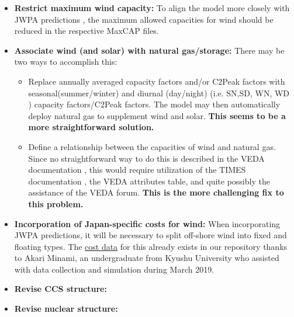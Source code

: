 \documentclass[14pt,a4paper]{article} %
\begin{document}
\begin{itemize}

\item \textbf{Restrict maximum wind capacity:} To align the model more closely with JWPA predictions \cite{heger_wind_2016}, the maximum allowed capacities for wind should be reduced in the respective MaxCAP files.

\item \textbf{Associate wind (and solar) with natural gas/storage:} There may be two ways to accomplish this:

\begin{itemize}

\item Replace annually averaged capacity factors and/or C2Peak factors with seasonal(summer/winter) and diurnal (day/night) (i.e. SN,SD, WN, WD \cite{gargiulo_documentation_2005} ) capacity factors/C2Peak factors. The model may then automatically deploy natural gas to supplement wind and solar. \textbf{This seems to be a more straightforward solution.}

\item Define a relationship between the capacities of wind and natural gas. Since no straightforward way to do this is described in the VEDA documentation \cite{gargiulo_documentation_2005}, this would require utilization of the TIMES documentation \cite{loulou_documentation_2005}, the VEDA attributes table, and quite possibly the assistance of the VEDA forum. \textbf{This is the more challenging fix to this problem.}

\end{itemize}

\item \textbf{Incorporation of Japan-specific costs for wind:} When incorporating JWPA predictions, it will be necessary to split off-shore wind into fixed and floating types. The \href{https://github.com/arfc/i2cner/tree/master/data/japan_costs}{cost data} for this already exists in our repository thanks to Akari Minami, an undergraduate from Kyushu University who assisted with data collection and simulation during March 2019.

\item \textbf{Revise CCS structure:}

\item \textbf{Revise nuclear structure:}

\end{itemize}



%


%

\end{document}
